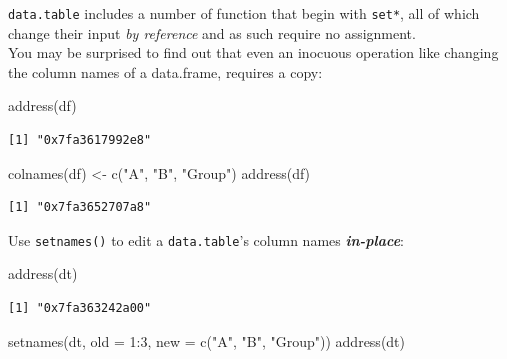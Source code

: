 \documentclass[
]{book}
\newenvironment{Shaded}{\begin{snugshade}}{\end{snugshade}}
\newcommand{\AttributeTok}[1]{\textcolor[rgb]{0.77,0.63,0.00}{#1}}
\newcommand{\DecValTok}[1]{\textcolor[rgb]{0.00,0.00,0.81}{#1}}
\newcommand{\FunctionTok}[1]{\textcolor[rgb]{0.00,0.00,0.00}{#1}}
\newcommand{\NormalTok}[1]{#1}
\newcommand{\OtherTok}[1]{\textcolor[rgb]{0.56,0.35,0.01}{#1}}
\newcommand{\SpecialCharTok}[1]{\textcolor[rgb]{0.00,0.00,0.00}{#1}}
\newcommand{\StringTok}[1]{\textcolor[rgb]{0.31,0.60,0.02}{#1}}
\begin{document}
\texttt{data.table} includes a number of function that begin with \texttt{set*}, all of which change their input \emph{by reference} and as such require no assignment.\\
You may be surprised to find out that even an inocuous operation like changing the column names of a data.frame, requires a copy:

\begin{Shaded}
\begin{Highlighting}[]
\FunctionTok{address}\NormalTok{(df)}
\end{Highlighting}
\end{Shaded}

\begin{verbatim}
[1] "0x7fa3617992e8"
\end{verbatim}

\begin{Shaded}
\begin{Highlighting}[]
\FunctionTok{colnames}\NormalTok{(df) }\OtherTok{\textless{}{-}} \FunctionTok{c}\NormalTok{(}\StringTok{"A"}\NormalTok{, }\StringTok{"B"}\NormalTok{, }\StringTok{"Group"}\NormalTok{)}
\FunctionTok{address}\NormalTok{(df)}
\end{Highlighting}
\end{Shaded}

\begin{verbatim}
[1] "0x7fa3652707a8"
\end{verbatim}

Use \texttt{setnames()} to edit a \texttt{data.table}'s column names \textbf{\emph{in-place}}:

\begin{Shaded}
\begin{Highlighting}[]
\FunctionTok{address}\NormalTok{(dt)}
\end{Highlighting}
\end{Shaded}

\begin{verbatim}
[1] "0x7fa363242a00"
\end{verbatim}

\begin{Shaded}
\begin{Highlighting}[]
\FunctionTok{setnames}\NormalTok{(dt, }\AttributeTok{old =} \DecValTok{1}\SpecialCharTok{:}\DecValTok{3}\NormalTok{, }\AttributeTok{new =} \FunctionTok{c}\NormalTok{(}\StringTok{"A"}\NormalTok{, }\StringTok{"B"}\NormalTok{, }\StringTok{"Group"}\NormalTok{))}
\FunctionTok{address}\NormalTok{(dt)}
\end{Highlighting}
\end{Shaded}
\end{document}
